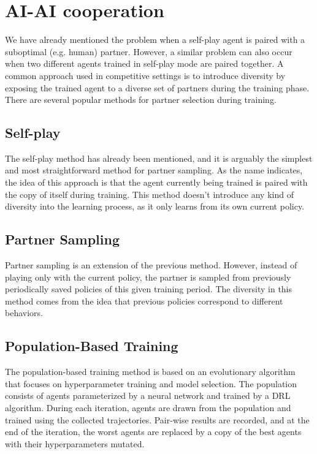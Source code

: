 \section{AI-AI cooperation}\label{aiaicooperation}
We have already mentioned the problem when a self-play agent is paired with a suboptimal (e.g. human) partner.
However, a similar problem can also occur when two different agents trained in self-play mode are paired together.
A common approach used in competitive settings is to introduce diversity by exposing the trained agent to a diverse set of partners during the training phase.
There are several popular methods for partner selection during training.

\subsection{Self-play}\label{selfplayMethod}
The self-play method has already been mentioned, and it is arguably the simplest and most straightforward method for partner sampling.
As the name indicates, the idea of this approach is that the agent currently being trained is paired with the copy of itself during training.
This method doesn't introduce any kind of diversity into the learning process, as it only learns from its own current policy.

\subsection{Partner Sampling}
Partner sampling is an extension of the previous method. 
However, instead of playing only with the current policy, the partner is sampled from previously periodically saved policies of this given training period.
The diversity in this method comes from the idea that previous policies correspond to different behaviors.

\subsection{Population-Based Training}
The population-based training method is based on an evolutionary algorithm that focuses on hyperparameter training and model selection.
The population consists of agents parameterized by a neural network and trained by a DRL algorithm.
During each iteration, agents are drawn from the population and trained using the collected trajectories.
Pair-wise results are recorded, and at the end of the iteration, the worst agents are replaced by a copy of the best agents with their hyperparameters mutated.

